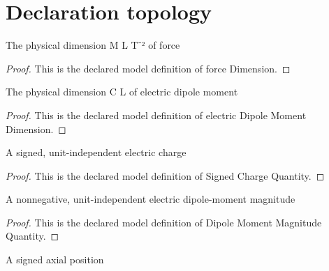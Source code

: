 \section{Declaration topology}
\begin{definition}
  \label{def:physics:phyx-mini-0911:phyxminiproblems-problemphyxmini0911-forcedimension}
  The physical dimension M L T⁻² of force
\end{definition}
\begin{proof}
  This is the declared model definition of force Dimension.
\end{proof}
\begin{definition}
  \label{def:physics:phyx-mini-0911:phyxminiproblems-problemphyxmini0911-electricdipolemomentdimension}
  The physical dimension C L of electric dipole moment
\end{definition}
\begin{proof}
  This is the declared model definition of electric Dipole Moment Dimension.
\end{proof}
\begin{definition}
  \label{def:physics:phyx-mini-0911:phyxminiproblems-problemphyxmini0911-signedchargequantity}
  A signed, unit-independent electric charge
\end{definition}
\begin{proof}
  This is the declared model definition of Signed Charge Quantity.
\end{proof}
\begin{definition}
  \label{def:physics:phyx-mini-0911:phyxminiproblems-problemphyxmini0911-dipolemomentmagnitudequantity}
  A nonnegative, unit-independent electric dipole-moment magnitude
\end{definition}
\begin{proof}
  This is the declared model definition of Dipole Moment Magnitude Quantity.
\end{proof}
\begin{definition}
  \label{def:physics:phyx-mini-0911:phyxminiproblems-problemphyxmini0911-axialpositionquantity}
  A signed axial position
\end{definition}
